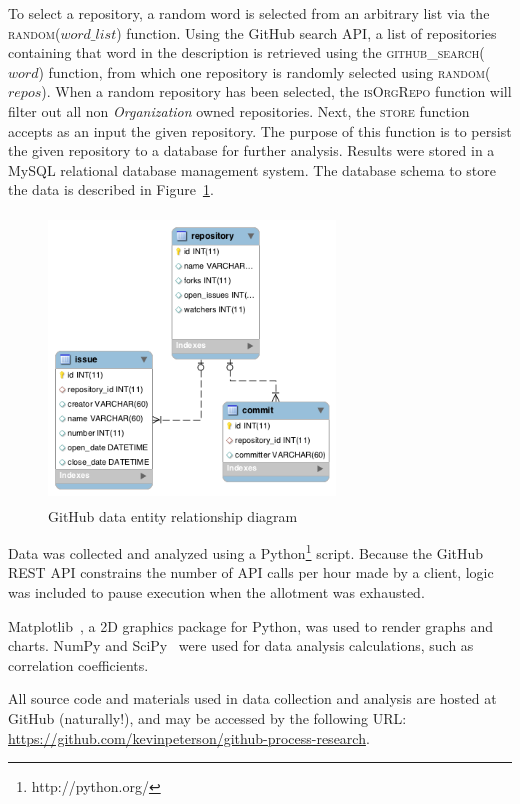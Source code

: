 \documentclass{proc}
\begin{document}
To select a repository, a random word is selected from an arbitrary list via the \textsc{random}($word\_list$) function. Using the GitHub search API, a list of repositories containing that word in the description is retrieved using the \textsc{github\_search}($word$) function, from which one repository is randomly selected using \textsc{random}($repos$). When a random repository has been selected, the \textsc{isOrgRepo} function will filter out all non \textit{Organization} owned repositories. Next, the \textsc{store} function accepts as an input the given repository. The purpose of this function is to persist the given repository to a database for further analysis. Results were stored in a MySQL relational database management system. The database schema to store the data is described in Figure~\ref{fig:er_diagram}.

\begin{figure}
\includegraphics[height=3in,width=3in]{images/er.png}
\caption{GitHub data entity relationship diagram}
\label{fig:er_diagram}
\end{figure}

Data was collected and analyzed using a Python\footnote{http://python.org/} script. Because the GitHub REST API constrains the number of API calls per hour made by a client, logic was included to pause execution when the allotment was exhausted.

Matplotlib~\cite{Hunter2007}, a 2D graphics package for Python, was used to render graphs and charts. NumPy and SciPy~\cite{scipy} were used for data analysis calculations, such as correlation coefficients.

All source code and materials used in data collection and analysis are hosted at GitHub (naturally!), and may be accessed by the following URL: \url{https://github.com/kevinpeterson/github-process-research}.
\end{document}
